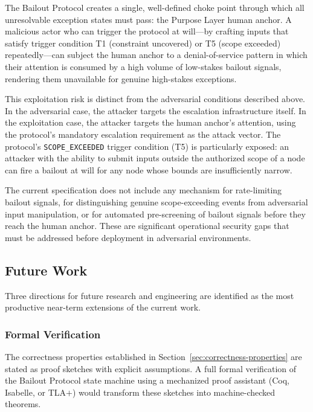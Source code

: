 The Bailout Protocol creates a single, well-defined choke point through which all unresolvable exception states must pass: the Purpose Layer human anchor. A malicious actor who can trigger the protocol at will---by crafting inputs that satisfy trigger condition T1 (constraint uncovered) or T5 (scope exceeded) repeatedly---can subject the human anchor to a denial-of-service pattern in which their attention is consumed by a high volume of low-stakes bailout signals, rendering them unavailable for genuine high-stakes exceptions.

This exploitation risk is distinct from the adversarial conditions described above. In the adversarial case, the attacker targets the escalation infrastructure itself. In the exploitation case, the attacker targets the human anchor's attention, using the protocol's mandatory escalation requirement as the attack vector. The protocol's \texttt{SCOPE\_EXCEEDED} trigger condition (T5) is particularly exposed: an attacker with the ability to submit inputs outside the authorized scope of a node can fire a bailout at will for any node whose bounds are insufficiently narrow.

The current specification does not include any mechanism for rate-limiting bailout signals, for distinguishing genuine scope-exceeding events from adversarial input manipulation, or for automated pre-screening of bailout signals before they reach the human anchor. These are significant operational security gaps that must be addressed before deployment in adversarial environments.

\subsection{Future Work}\label{sec:future-work}

Three directions for future research and engineering are identified as the most productive near-term extensions of the current work.

\subsubsection{Formal Verification}\label{sec:formal-verification}

The correctness properties established in Section~\ref{sec:correctness-properties} are stated as proof sketches with explicit assumptions. A full formal verification of the Bailout Protocol state machine using a mechanized proof assistant (Coq, Isabelle, or TLA$+$) would transform these sketches into machine-checked theorems.


